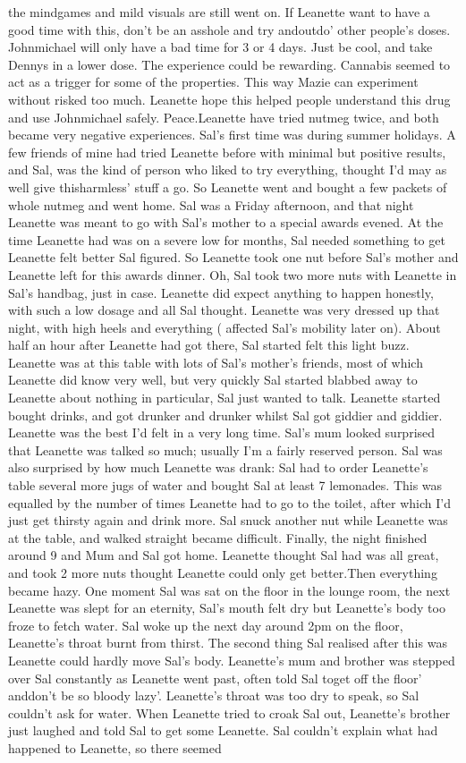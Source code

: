 \documentclass[12pt]{book}
\begin{document}
the mindgames and mild visuals are still went on. If Leanette want to have a good time with this, don't be an asshole and try andoutdo' other people's doses. Johnmichael will only have a bad time for 3 or 4 days. Just be cool, and take Dennys in a lower dose. The experience could be rewarding. Cannabis seemed to act as a trigger for some of the properties. This way Mazie can experiment without risked too much. Leanette hope this helped people understand this drug and use Johnmichael safely. Peace.Leanette have tried nutmeg twice, and both became very negative experiences. Sal's first time was during summer holidays. A few friends of mine had tried Leanette before with minimal but positive results, and Sal, was the kind of person who liked to try everything, thought I'd may as well give thisharmless' stuff a go. So Leanette went and bought a few packets of whole nutmeg and went home. Sal was a Friday afternoon, and that night Leanette was meant to go with Sal's mother to a special awards evened. At the time Leanette had was on a severe low for months, Sal needed something to get Leanette felt better Sal figured. So Leanette took one nut before Sal's mother and Leanette left for this awards dinner. Oh, Sal took two more nuts with Leanette in Sal's handbag, just in case. Leanette did expect anything to happen honestly, with such a low dosage and all Sal thought. Leanette was very dressed up that night, with high heels and everything ( affected Sal's mobility later on). About half an hour after Leanette had got there, Sal started felt this light buzz. Leanette was at this table with lots of Sal's mother's friends, most of which Leanette did know very well, but very quickly Sal started blabbed away to Leanette about nothing in particular, Sal just wanted to talk. Leanette started bought drinks, and got drunker and drunker whilst Sal got giddier and giddier. Leanette was the best I'd felt in a very long time. Sal's mum looked surprised that Leanette was talked so much; usually I'm a fairly reserved person. Sal was also surprised by how much Leanette was drank: Sal had to order Leanette's table several more jugs of water and bought Sal at least 7 lemonades. This was equalled by the number of times Leanette had to go to the toilet, after which I'd just get thirsty again and drink more. Sal snuck another nut while Leanette was at the table, and walked straight became difficult. Finally, the night finished around 9 and Mum and Sal got home. Leanette thought Sal had was all great, and took 2 more nuts thought Leanette could only get better.Then everything became hazy. One moment Sal was sat on the floor in the lounge room, the next Leanette was slept for an eternity, Sal's mouth felt dry but Leanette's body too froze to fetch water. Sal woke up the next day around 2pm on the floor, Leanette's throat burnt from thirst. The second thing Sal realised after this was Leanette could hardly move Sal's body. Leanette's mum and brother was stepped over Sal constantly as Leanette went past, often told Sal toget off the floor' anddon't be so bloody lazy'. Leanette's throat was too dry to speak, so Sal couldn't ask for water. When Leanette tried to croak Sal out, Leanette's brother just laughed and told Sal to get some Leanette. Sal couldn't explain what had happened to Leanette, so there seemed 
\end{document}
